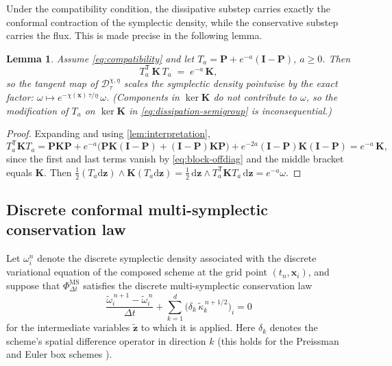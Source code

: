 \documentclass[11pt]{article}
\newtheorem{lemma}[theorem]{Lemma}
\theoremstyle{definition}
\theoremstyle{remark}
\newcommand{\dd}{\mathrm{d}}
\newcommand{\bz}{\bm{z}}
\newcommand{\bx}{\bm{x}}
\newcommand{\bK}{\bm{K}}
\newcommand{\bP}{\bm{P}}
\newcommand{\bI}{\bm{I}}
\newcommand{\chixx}{\chi(\bx)}
\newcommand{\Do}{\mathcal{D}}
\begin{document}
Under the compatibility condition, the dissipative substep carries
exactly the conformal contraction of the symplectic density,
while the conservative substep carries the flux. This is made precise in the following lemma.

\begin{lemma}
\label{lem:dissipative-contraction}
Assume \eqref{eq:compatibility} and let
$T_a=\bP+e^{-a}(\bI-\bP)$, $a\ge0$.  Then
\begin{equation}
\label{eq:TKT}
T_a^{\mathsf T}\,\bK\,T_a \;=\; e^{-a}\,\bK ,
\end{equation}
so the tangent map of $\Do^{\chi,\eta}_{\tau}$ scales the symplectic
density pointwise by the exact factor:
$\omega\mapsto e^{-\chixx\,\tau/\eta}\,\omega$.  (Components in
$\ker\bK$ do not contribute to $\omega$, so the modification of $T_a$
on $\ker\bK$ in \eqref{eq:dissipation-semigroup} is inconsequential.)
\end{lemma}

\begin{proof}
Expanding and using \cref{lem:interpretation},
\[
T_a^{\mathsf T}\bK T_a
= \bP\bK\bP + e^{-a}\bigl(\bP\bK(\bI-\bP)+(\bI-\bP)\bK\bP\bigr)
+ e^{-2a}(\bI-\bP)\bK(\bI-\bP)
= e^{-a}\,\bK ,
\]
since the first and last terms vanish by \eqref{eq:block-offdiag} and
the middle bracket equals $\bK$.  Then
$\tfrac12(T_a\dd\bz)\wedge\bK(T_a\dd\bz)
=\tfrac12\,\dd\bz\wedge T_a^{\mathsf T}\bK T_a\,\dd\bz
=e^{-a}\omega$.
\end{proof}

\subsection{Discrete conformal multi-symplectic conservation law}
\label{subsec:discrete-law}

Let $\omega^n_i$ denote the discrete symplectic density associated
with the discrete variational equation of the composed scheme at the
grid point $(t_n,\bx_i)$, and suppose that
$\Phi^{\mathrm{MS}}_{\Delta t}$ satisfies the discrete
multi-symplectic conservation law
\begin{equation}
\label{eq:discrete-ms}
\frac{\tilde\omega^{\,n+1}_i - \tilde\omega^{\,n}_i}{\Delta t}
+ \sum_{k=1}^{d}
\bigl(\delta_k\,\tilde\kappa^{\,n+1/2}_k\bigr)_i = 0
\end{equation}
for the intermediate variables $\tilde{\bz}$ to which it is applied.
Here $\delta_k$ denotes the scheme's spatial difference operator in
direction $k$ (this holds for the Preissman and Euler box schemes
\cite{bridges2001multi}).
\end{document}
